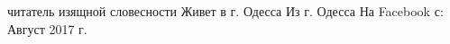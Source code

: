  
 
 
 
 

\par
читатель изящной словесности
Живет в г. Одесса
Из г. Одесса
На Facebook с: Август 2017 г.

